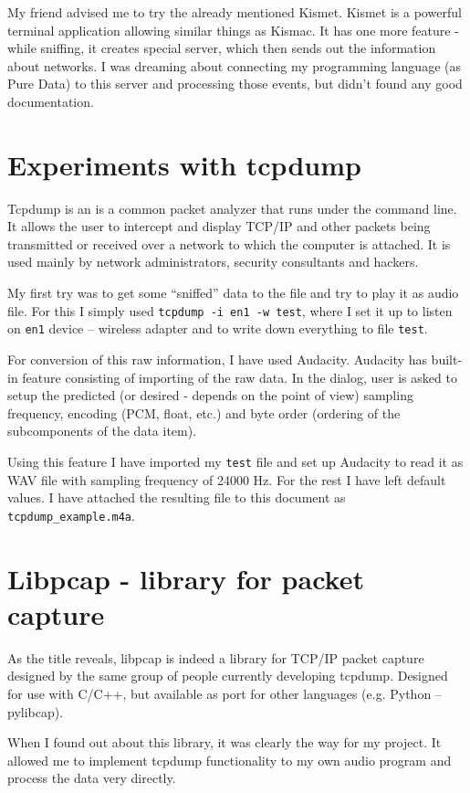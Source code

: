 \documentclass[11pt,a4paper,oneside]{article}
\begin{document}
My friend advised me to try the already mentioned Kismet. Kismet is a powerful terminal application allowing similar things as Kismac. It has one more feature - while sniffing, it creates special server, which then sends out the information about networks. I was dreaming about connecting my programming language (as Pure Data) to this server and processing those events, but didn't found any good documentation.

\section{Experiments with tcpdump}
Tcpdump is an is a common packet analyzer that runs under the command line. It allows the user to intercept and display TCP/IP and other packets being transmitted or received over a network to which the computer is attached. It is used mainly by network administrators, security consultants and hackers.

My first try was to get some ``sniffed'' data to the file and try to play it as audio file. For this I simply used \texttt{tcpdump -i en1 -w test}, where I set it up to listen on \texttt{en1} device -- wireless adapter and to write down everything to file \texttt{test}.

For conversion of this raw information, I have used Audacity. Audacity has built-in feature consisting of importing of the raw data. In the dialog, user is asked to setup the predicted (or desired - depends on the point of view) sampling frequency, encoding (PCM, float, etc.) and byte order (ordering of the subcomponents of the data item).

Using this feature I have imported my \texttt{test} file and set up Audacity to read it as WAV file with sampling frequency of 24000 Hz. For the rest I have left default values. I have attached the resulting file to this document as \texttt{tcpdump\_example.m4a}.

\section{Libpcap - library for packet capture}
As the title reveals, libpcap is indeed a library for TCP/IP packet capture designed by the same group of people currently developing tcpdump. Designed for use with C/C++, but available as port for other languages (e.g. Python -- pylibcap). 

When I found out about this library, it was clearly the way for my project. It allowed me to implement tcpdump functionality to my own audio program and process the data very directly.
\end{document}
